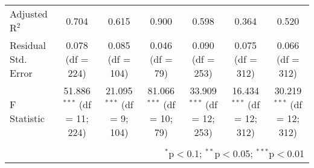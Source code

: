 \documentclass[spanish,11pt]{article}
\begin{document}
\begin{table}[!htbp]
\begin{tabular}{@{\extracolsep{5pt}}lcccccc}
Adjusted R$^{2}$ & 0.704 & 0.615 & 0.900 & 0.598 & 0.364 & 0.520 \\ 
Residual Std. Error & 0.078 (df = 224) & 0.085 (df = 104) & 0.046 (df = 79) & 0.090 (df = 253) & 0.075 (df = 312) & 0.066 (df = 312) \\ 
F Statistic & 51.886$^{***}$ (df = 11; 224) & 21.095$^{***}$ (df = 9; 104) & 81.066$^{***}$ (df = 10; 79) & 33.909$^{***}$ (df = 12; 253) & 16.434$^{***}$ (df = 12; 312) & 30.219$^{***}$ (df = 12; 312) \\ 
\hline 
\hline \\[-1.8ex] 
\multicolumn{7}{r}{$^{*}$p$<$0.1; $^{**}$p$<$0.05; $^{***}$p$<$0.01} \\ 
\end{tabular} 
\end{table} 
\end{document}
